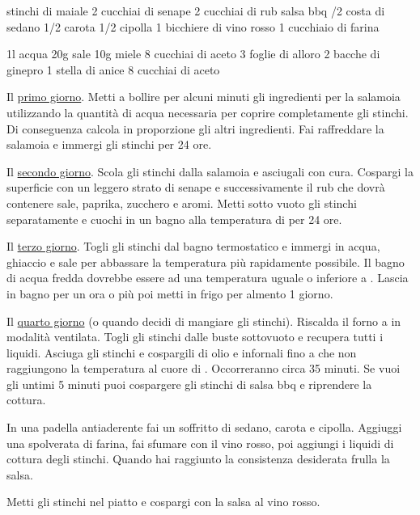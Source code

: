 \cbt
\begin{ingreds}
	 stinchi di maiale
	2 cucchiai di senape
	2 cucchiai di rub
	salsa bbq
	/2 costa di sedano
	1/2 carota
	1/2 cipolla
	1 bicchiere di vino rosso
	1 cucchiaio di farina

\columnbreak
	1l acqua
	20g sale
	10g miele
	8 cucchiai di aceto
	3 foglie di alloro
	2 bacche di ginepro
	1 stella di anice
	8 cucchiai di aceto
\end{ingreds}

\begin{method}
	Il \underline{primo giorno}. Metti a bollire per alcuni minuti gli ingredienti per la salamoia utilizzando la quantità di acqua necessaria per coprire completamente gli stinchi. Di conseguenza calcola in proporzione gli altri ingredienti. Fai raffreddare la salamoia e immergi gli stinchi per 24 ore.

	Il \underline{secondo giorno}. Scola gli stinchi dalla salamoia e asciugali con cura. Cospargi la superficie con un leggero strato di senape e successivamente il rub che dovrà contenere sale, paprika, zucchero e aromi. Metti sotto vuoto gli stinchi separatamente e cuochi in un bagno alla temperatura di  per 24 ore.

	Il \underline{terzo giorno}. Togli gli stinchi dal bagno termostatico e immergi in acqua, ghiaccio e sale per abbassare la temperatura più rapidamente possibile. Il bagno di acqua fredda dovrebbe essere ad una temperatura uguale o inferiore a . Lascia in bagno per un ora o più poi metti in frigo per almento 1 giorno.

	Il \underline{quarto giorno} (o quando decidi di mangiare gli stinchi). Riscalda il forno a  in modalità ventilata. Togli gli stinchi dalle buste sottovuoto e recupera tutti i liquidi. Asciuga gli stinchi e cospargili di olio e infornali fino a che non raggiungono la temperatura al cuore di . Occorreranno circa 35 minuti. Se vuoi gli untimi 5 minuti puoi cospargere gli stinchi di salsa bbq e riprendere la cottura.

In una padella antiaderente fai un soffritto di sedano, carota e cipolla. Aggiuggi una spolverata di farina, fai sfumare con il vino rosso, poi aggiungi i liquidi di cottura degli stinchi. Quando hai raggiunto la consistenza desiderata frulla la salsa.

Metti gli stinchi nel piatto e cospargi con la salsa al vino rosso.
\end {method}



